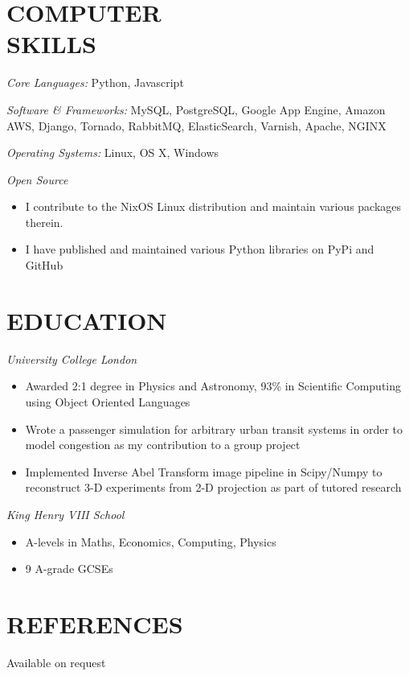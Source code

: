 \documentclass[margin, 10pt]{res}
\begin{document}
\begin{resume}

\section{COMPUTER \\ SKILLS}

{\sl Core Languages:}
Python, Javascript

{\sl Software \& Frameworks:}
MySQL, PostgreSQL, Google App Engine, Amazon AWS, Django, Tornado, RabbitMQ, ElasticSearch, Varnish, Apache, NGINX

{\sl Operating Systems:} Linux, OS X, Windows

{\sl Open Source}
\begin{itemize}
\item I contribute to the NixOS Linux distribution and maintain various packages therein.
\item I have published and maintained various Python libraries on PyPi and GitHub
\end{itemize}


\section{EDUCATION}

{\sl University College London} \\
\begin{itemize} \itemsep -2pt %
\item Awarded 2:1 degree in Physics and Astronomy, 93\% in Scientific Computing using Object Oriented Languages
\item Wrote a passenger simulation for arbitrary urban transit systems in order to model congestion as my contribution to a group project
\item Implemented Inverse Abel Transform image pipeline in Scipy/Numpy to reconstruct 3-D experiments from 2-D projection as part of tutored research
\end{itemize}

{\sl King Henry VIII School} \\
\begin{itemize}
\item A-levels in Maths, Economics, Computing, Physics
\item 9 A-grade GCSEs
\end{itemize}

\section{REFERENCES}
Available on request

\end{resume}
\end{document}
